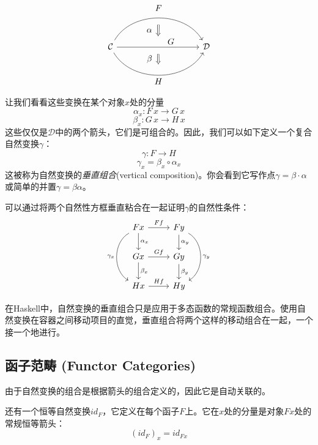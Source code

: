 \documentclass[DaoFP]{subfiles}
\begin{document}
    \[
        \begin{tikzcd}[column sep=huge]
            \mathcal{C}
            \arrow[bend left=60]{rr}[name=U, label=above:$F$]{}
            \arrow[]{rr}[name=M, label={[xshift=15pt, yshift=-5pt]:$G$}]{}
            \arrow[bend right=60]{rr}[name=D, label=below:$H$]{}
            &&
            \mathcal{D}
            \arrow[shorten <=8pt, shorten >=8pt,Rightarrow, to path={(U) -- node[label=left:$\alpha$] {} (M)}]{}
            \arrow[shorten <=8pt, shorten >=8pt,Rightarrow, to path={(M) -- node[label=left:$\beta$] {} (D)}]{}
        \end{tikzcd}
    \]

    让我们看看这些变换在某个对象$x$处的分量
    \[ \alpha_x \colon F \, x \to G \, x \]
    \[ \beta_x \colon G \, x \to H \, x \]
    这些仅仅是$\mathcal{D}$中的两个箭头，它们是可组合的。因此，我们可以如下定义一个复合自然变换$\gamma$：
    \[ \gamma \colon F \to H\]
    \[ \gamma_x = \beta_x \circ \alpha_x \]
    这被称为自然变换的\emph{垂直组合}(vertical composition)。你会看到它写作点$\gamma = \beta \cdot \alpha$或简单的并置$\gamma = \beta \alpha$。

    可以通过将两个自然性方框垂直粘合在一起证明$\gamma$的自然性条件：
    \[
        \begin{tikzcd}
            F x
            \arrow[d, "\alpha_x"]
            \arrow[r, "F f"]
            \arrow[dd, bend right = 60, "\gamma_x"']
            &
            F y
            \arrow[d, "\alpha_y"]
            \arrow[dd, bend left = 60, "\gamma_y"]
            \\
            G x
            \arrow[r, "G f"]
            \arrow[d, "\beta_x"]
            & G y
            \arrow[d, "\beta_y"]
            \\
            H x
            \arrow[r, "H f"]
            & H y
        \end{tikzcd}
    \]

    在Haskell中，自然变换的垂直组合只是应用于多态函数的常规函数组合。使用自然变换在容器之间移动项目的直觉，垂直组合将两个这样的移动组合在一起，一个接一个地进行。

    \subsection{函子范畴 (Functor Categories)}

    由于自然变换的组合是根据箭头的组合定义的，因此它是自动关联的。

    还有一个恒等自然变换$id_F$，它定义在每个函子$F$上。它在$x$处的分量是对象$F x$处的常规恒等箭头：
    \[ (id_F)_x = id_{F x} \]
\end{document}
